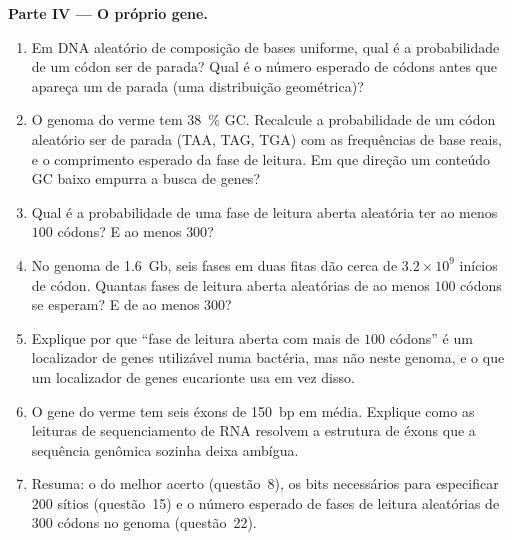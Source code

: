 \begin{problem}
\medskip
\noindent\textbf{Parte IV --- O próprio gene.}
\begin{enumerate}[resume]
  \item Em DNA aleatório de composição de bases uniforme, qual é a
        probabilidade de um códon ser de parada? Qual é o número
        esperado de códons antes que apareça um de parada (uma
        distribuição geométrica)?
  \item O genoma do verme tem \qty{38}{\%} GC. Recalcule a
        probabilidade de um códon aleatório ser de parada (TAA, TAG,
        TGA) com as frequências de base reais, e o comprimento
        esperado da fase de leitura. Em que direção um conteúdo GC
        baixo empurra a busca de genes?
  \item Qual é a probabilidade de uma fase de leitura aberta aleatória
        ter ao menos $100$ códons? E ao menos $300$?
  \item No genoma de \qty{1.6}{Gb}, seis fases em duas fitas dão cerca
        de $3.2\times 10^{9}$ inícios de códon. Quantas fases de
        leitura aberta aleatórias de ao menos $100$ códons se esperam?
        E de ao menos $300$?
  \item Explique por que ``fase de leitura aberta com mais de $100$
        códons'' é um localizador de genes utilizável numa bactéria,
        mas não neste genoma, e o que um localizador de genes
        eucarionte usa em vez disso.
  \item O gene do verme tem seis éxons de \qty{150}{bp} em média.
        Explique como as leituras de sequenciamento de RNA resolvem a
        estrutura de éxons que a sequência genômica sozinha deixa
        ambígua.
  \item Resuma: o  do melhor acerto (questão~8), os bits
        necessários para especificar $200$ sítios (questão~15) e o
        número esperado de fases de leitura aleatórias de $300$ códons
        no genoma (questão~22).
\end{enumerate}
\end{problem}
